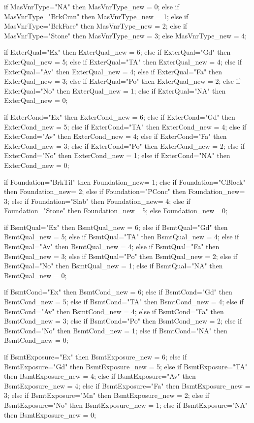 		if MasVnrType="NA" 			then MasVnrType_new = 0;
		else if MasVnrType="BrkCmn" then MasVnrType_new = 1;
		else if MasVnrType="BrkFace" then MasVnrType_new = 2;
		else if MasVnrType="Stone" 	then MasVnrType_new = 3;
		else MasVnrType_new = 4;

		if ExterQual="Ex" 		then ExterQual_new = 6;
		else if ExterQual="Gd" 	then ExterQual_new = 5;
		else if ExterQual="TA" 	then ExterQual_new = 4;
		else if ExterQual="Av" 	then ExterQual_new = 4;
		else if ExterQual="Fa" 	then ExterQual_new = 3;
		else if ExterQual="Po" 	then ExterQual_new = 2;
		else if ExterQual="No" 	then ExterQual_new = 1;
		else if ExterQual="NA" 	then ExterQual_new = 0;

		if ExterCond="Ex" 		then ExterCond_new = 6;
		else if ExterCond="Gd" 	then ExterCond_new = 5;
		else if ExterCond="TA" 	then ExterCond_new = 4;
		else if ExterCond="Av" 	then ExterCond_new = 4;
		else if ExterCond="Fa" 	then ExterCond_new = 3;
		else if ExterCond="Po" 	then ExterCond_new = 2;
		else if ExterCond="No" 	then ExterCond_new = 1;
		else if ExterCond="NA" 	then ExterCond_new = 0;

		if Foundation="BrkTil" then Foundation_new= 1;
		else if Foundation="CBlock" then Foundation_new= 2;
		else if Foundation="PConc" then Foundation_new= 3;
		else if Foundation="Slab" then Foundation_new= 4;
		else if Foundation="Stone" then Foundation_new= 5;
		else Foundation_new= 0;

		if BsmtQual="Ex" 		then BsmtQual_new = 6;
		else if BsmtQual="Gd" 	then BsmtQual_new = 5;
		else if BsmtQual="TA" 	then BsmtQual_new = 4;
		else if BsmtQual="Av" 	then BsmtQual_new = 4;
		else if BsmtQual="Fa" 	then BsmtQual_new = 3;
		else if BsmtQual="Po" 	then BsmtQual_new = 2;
		else if BsmtQual="No" 	then BsmtQual_new = 1;
		else if BsmtQual="NA" 	then BsmtQual_new = 0;

		if BsmtCond="Ex" 		then BsmtCond_new = 6;
		else if BsmtCond="Gd" 	then BsmtCond_new = 5;
		else if BsmtCond="TA" 	then BsmtCond_new = 4;
		else if BsmtCond="Av" 	then BsmtCond_new = 4;
		else if BsmtCond="Fa" 	then BsmtCond_new = 3;
		else if BsmtCond="Po" 	then BsmtCond_new = 2;
		else if BsmtCond="No" 	then BsmtCond_new = 1;
		else if BsmtCond="NA" 	then BsmtCond_new = 0;

		if BsmtExposure="Ex" 		then BsmtExposure_new = 6;
		else if BsmtExposure="Gd" 	then BsmtExposure_new = 5;
		else if BsmtExposure="TA" 	then BsmtExposure_new = 4;
		else if BsmtExposure="Av" 	then BsmtExposure_new = 4;
		else if BsmtExposure="Fa" 	then BsmtExposure_new = 3;
		else if BsmtExposure="Mn" 	then BsmtExposure_new = 2;
		else if BsmtExposure="No" 	then BsmtExposure_new = 1;
		else if BsmtExposure="NA" 	then BsmtExposure_new = 0;

